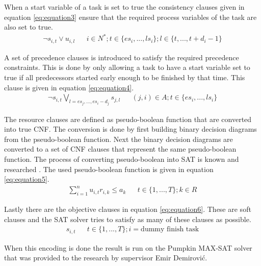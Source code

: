 When a start variable of a task is set to true the consistency clauses given in equation \ref{eq:equation3} ensure that the required process variables of the task are also set to true.
\begin{align}\label{eq:equation3}
\neg s_{i,t} \vee u_{i,l}   &&  i\in N^*;t\in \{es_i,...,ls_i\};l\in \{t,...,t+d_i-1\}
\end{align}

A set of precedence clauses is introduced to satisfy the required precedence constraints. This is done by only allowing a task to have a start variable set to true if all predecessors started early enough to be finished by that time. This clause is given in equation \ref{eq:equation4}.
\begin{align}\label{eq:equation4}
\neg s_{i,t} \bigvee_{l=es_j,...,es_i-d_j} s_{j,l}  &&  (j,i)\in A; t\in\{es_i,...,ls_i\}
\end{align}

The resource clauses are defined as pseudo-boolean function that are converted into true CNF. The conversion is done by first building binary decision diagrams from the pseudo-boolean function. Next the binary decision diagrams are converted to a set of CNF clauses that represent the same pseudo-boolean function. The process of converting pseudo-boolean into SAT is known and researched \cite{RN38}. The used pseudo-boolean function is given in equation \ref{eq:equation5}.
\begin{align}\label{eq:equation5}
\sum^n_{i=1} u_{i,t}r_{i,k} \leq a_k    &&  t\in \{1,...,T\}; k\in R
\end{align}

Lastly there are the objective clauses in equation \ref{eq:equation6}. These are soft clauses and the SAT solver tries to satisfy as many of these clauses as possible.
\begin{align}\label{eq:equation6}
s_{i,t} &&  t\in \{1,...,T\}; i = \text{dummy finish task}
\end{align}

When this encoding is done the result is run on the Pumpkin MAX-SAT solver that was provided to the research by supervisor Emir Demirović.

